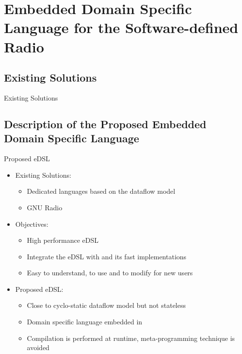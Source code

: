 
\section[eDSL for the SDR]{Embedded Domain Specific Language for the Software-defined Radio}

\subsection[Existing Solutions]{Existing Solutions}

\begin{frame}{Existing Solutions}

\end{frame}

\subsection[Proposed eDSL]{Description of the Proposed Embedded Domain Specific Language}

\begin{frame}{Proposed eDSL}


  \vfill
  \begin{itemize}
    \item Existing Solutions:
    \begin{itemize}
      \item Dedicated languages based on the dataflow model~\cite{Dennis1980,Engels1994}
      \item GNU Radio~\cite{GNURadio}
    \end{itemize}
    \vspace{0.3cm}
    \pause
    \item Objectives:
    \begin{itemize}
      \item High performance eDSL
      \item Integrate the eDSL with \AFFECT and its fast implementations
      \item Easy to understand, to use and to modify for new users
    \end{itemize}
    \vspace{0.3cm}
    \pause
    \item Proposed eDSL:
    \begin{itemize}
      \item Close to cyclo-static dataflow model but not stateless
      \item Domain specific language embedded in \Cxx
      \item Compilation is performed at runtime, meta-programming technique is avoided
    \end{itemize}
  \end{itemize}
  \vfill
\end{frame}

